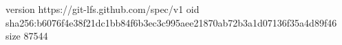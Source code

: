 version https://git-lfs.github.com/spec/v1
oid sha256:b6076f4e38f21dc1bb84f6b3ec3c995aee21870ab72b3a1d07136f35a4d89f46
size 87544
